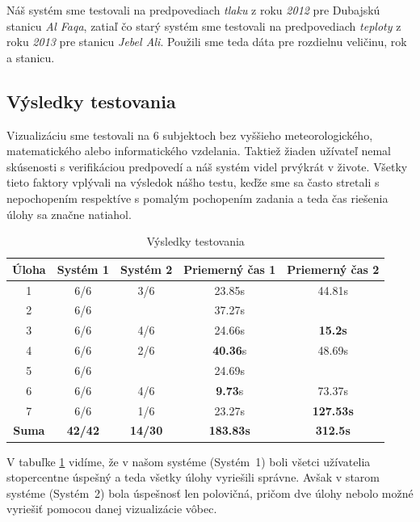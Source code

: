 Náš systém sme testovali na predpovediach \textit{tlaku} z roku \textit{2012} pre Dubajskú stanicu \textit{Al Faqa}, zatiaľ čo starý systém sme testovali na predpovediach \textit{teploty} z roku \textit{2013} pre stanicu \textit{Jebel Ali}. Použili sme teda dáta pre rozdielnu veličinu, rok a stanicu.

\subsection{Výsledky testovania}

Vizualizáciu sme testovali na 6 subjektoch bez vyššieho meteorologického, matematického alebo informatického vzdelania. Taktiež žiaden užívateľ nemal skúsenosti s verifikáciou predpovedí a náš systém videl prvýkrát v živote. Všetky tieto faktory vplývali na výsledok nášho testu, keďže sme sa často stretali s nepochopením respektíve s pomalým pochopením zadania a teda čas riešenia úlohy sa značne natiahol.

\begin{table}[h]
	\centering
	\caption{Výsledky testovania}
	\label{table:results}
	\begin{tabular}{|c|c|c|c|c|}
		\hline
		\rowcolor[HTML]{9B9B9B} \textbf{Úloha} & \textbf{Systém 1} & \textbf{Systém 2} & \textbf{Priemerný čas 1} & \textbf{Priemerný čas 2} \\ \hline
		1  &  6/6   &  3/6 	 &  23.85s 		    &  44.81s   \\ \hline
		2  &  6/6   &\textemdash&  37.27s 		    &  \textemdash   \\ \hline
		3  &  6/6   &  4/6   &  24.66s 		    &  \textbf{15.2s}   \\ \hline
		4  &  6/6   &  2/6   &  \textbf{40.36}s &  48.69s   \\ \hline
		5  &  6/6   &\textemdash&  24.69s          &   \textemdash   \\ \hline
		6  &  6/6   &  4/6   &  \textbf{9.73}s  &  73.37s   \\ \hline
		7  &  6/6   &  1/6   &  23.27s          &  \textbf{127.53s}   \\ \hline
		\rowcolor[HTML]{C0C0C0} \textbf{Suma}  & \textbf{42/42} & \textbf{14/30} & \textbf{183.83s} & \textbf{312.5s}\\ \hline
	\end{tabular}
\end{table}

\pagebreak

V tabuľke \ref{table:results} vidíme, že v našom systéme \mbox{(Systém 1)} boli všetci užívatelia stopercentne úspešný a teda všetky úlohy vyriešili správne. Avšak v starom systéme \mbox{(Systém 2)} bola úspešnosť len polovičná, pričom dve úlohy nebolo možné vyriešiť pomocou danej vizualizácie vôbec.

